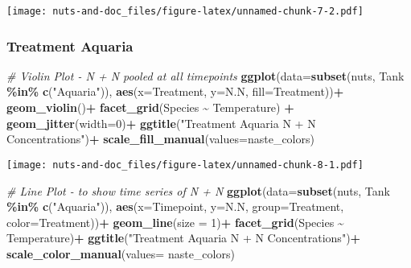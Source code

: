 \documentclass[
]{article}
\newenvironment{Shaded}{\begin{snugshade}}{\end{snugshade}}
\newcommand{\AttributeTok}[1]{\textcolor[rgb]{0.13,0.29,0.53}{#1}}
\newcommand{\CommentTok}[1]{\textcolor[rgb]{0.56,0.35,0.01}{\textit{#1}}}
\newcommand{\DecValTok}[1]{\textcolor[rgb]{0.00,0.00,0.81}{#1}}
\newcommand{\FunctionTok}[1]{\textcolor[rgb]{0.13,0.29,0.53}{\textbf{#1}}}
\newcommand{\NormalTok}[1]{#1}
\newcommand{\SpecialCharTok}[1]{\textcolor[rgb]{0.81,0.36,0.00}{\textbf{#1}}}
\newcommand{\StringTok}[1]{\textcolor[rgb]{0.31,0.60,0.02}{#1}}
\begin{document}
\texttt{[image: nuts-and-doc\_files/figure-latex/unnamed-chunk-7-2.pdf]}

\hypertarget{treatment-aquaria}{%
\subsubsection{Treatment Aquaria}\label{treatment-aquaria}}

\begin{Shaded}
\begin{Highlighting}[]
\CommentTok{\# Violin Plot {-} N + N pooled at all timepoints}
\FunctionTok{ggplot}\NormalTok{(}\AttributeTok{data=}\FunctionTok{subset}\NormalTok{(nuts, Tank }\SpecialCharTok{\%in\%} \FunctionTok{c}\NormalTok{(}\StringTok{"Aquaria"}\NormalTok{)), }\FunctionTok{aes}\NormalTok{(}\AttributeTok{x=}\NormalTok{Treatment, }\AttributeTok{y=}\NormalTok{N.N, }\AttributeTok{fill=}\NormalTok{Treatment))}\SpecialCharTok{+}
  \FunctionTok{geom\_violin}\NormalTok{()}\SpecialCharTok{+}
  \FunctionTok{facet\_grid}\NormalTok{(Species }\SpecialCharTok{\textasciitilde{}}\NormalTok{ Temperature) }\SpecialCharTok{+}
  \FunctionTok{geom\_jitter}\NormalTok{(}\AttributeTok{width=}\DecValTok{0}\NormalTok{)}\SpecialCharTok{+}
  \FunctionTok{ggtitle}\NormalTok{(}\StringTok{"Treatment Aquaria N + N Concentrations"}\NormalTok{)}\SpecialCharTok{+}
  \FunctionTok{scale\_fill\_manual}\NormalTok{(}\AttributeTok{values=}\NormalTok{naste\_colors)}
\end{Highlighting}
\end{Shaded}

\texttt{[image: nuts-and-doc\_files/figure-latex/unnamed-chunk-8-1.pdf]}

\begin{Shaded}
\begin{Highlighting}[]
\CommentTok{\# Line Plot {-} to show time series of N + N}
\FunctionTok{ggplot}\NormalTok{(}\AttributeTok{data=}\FunctionTok{subset}\NormalTok{(nuts, Tank }\SpecialCharTok{\%in\%} \FunctionTok{c}\NormalTok{(}\StringTok{"Aquaria"}\NormalTok{)), }\FunctionTok{aes}\NormalTok{(}\AttributeTok{x=}\NormalTok{Timepoint, }\AttributeTok{y=}\NormalTok{N.N, }\AttributeTok{group=}\NormalTok{Treatment, }\AttributeTok{color=}\NormalTok{Treatment))}\SpecialCharTok{+}
  \FunctionTok{geom\_line}\NormalTok{(}\AttributeTok{size =} \DecValTok{1}\NormalTok{)}\SpecialCharTok{+}
  \FunctionTok{facet\_grid}\NormalTok{(Species }\SpecialCharTok{\textasciitilde{}}\NormalTok{ Temperature)}\SpecialCharTok{+}
  \FunctionTok{ggtitle}\NormalTok{(}\StringTok{"Treatment Aquaria N + N Concentrations"}\NormalTok{)}\SpecialCharTok{+}
  \FunctionTok{scale\_color\_manual}\NormalTok{(}\AttributeTok{values=}\NormalTok{ naste\_colors)}
\end{Highlighting}
\end{Shaded}
\end{document}
